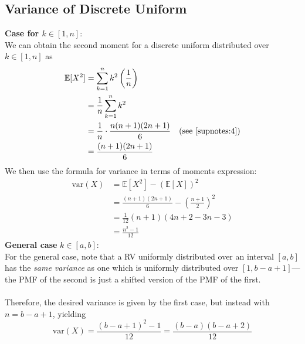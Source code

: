 \documentclass{report}
\begin{document}
\subsection{Variance of Discrete Uniform}
\textbf{Case for $k\in[1,n]$}:\\
We can obtain the second moment for a discrete uniform distributed over $k\in[1,n]$ as
\begin{align*}
\mathbb{E}[X^2]&=\sum^{n}_{k=1}k^2\left(\frac{1}{n}\right)\\
&=\frac{1}{n}\sum^{n}_{k=1}k^2\\
&=\frac{1}{n}\cdot\frac{n(n+1)(2n+1)}{6}\quad\text{(see \ref{supnotes:4})}\\
&=\frac{(n+1)(2n+1)}{6}
\end{align*}
We then use the formula for variance in terms of moments expression:
\begin{align*}
\text{var}(X)&=\mathbb{E}[X^2]-(\mathbb{E}[X])^2\\
&=\frac{(n+1)(2n+1)}{6}-\left(\frac{n+1}{2}\right)^2\\
&=\frac{1}{12}(n+1)(4n+2-3n-3)\\
&=\frac{n^2-1}{12}
\end{align*}
\textbf{General case} $k\in[a,b]$:\\
For the general case, note that a RV uniformly distributed over an interval $[a,b]$ has the \textit{same variance}
as one which is uniformly distributed over $[1,b-a+1]$---the PMF of the second is just a shifted version
of the PMF of the first.\\
\vspace{1mm}\\
Therefore, the desired variance is given by the first case, but instead with $n=b-a+1$, yielding
\begin{equation*}
\boxed{\text{var}(X)=\frac{(b-a+1)^2-1}{12}=\frac{(b-a)(b-a+2)}{12}}
\end{equation*}
\newpage
\end{document}
